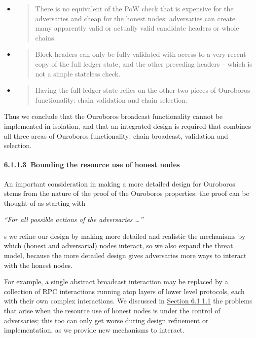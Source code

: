 \documentclass[]{article}
\let\oldparagraph\paragraph
\renewcommand{\paragraph}[1]{\oldparagraph{#1}\mbox{}}
\begin{document}
\begin{itemize}
\item
  \begin{quote}
  There is no equivalent of the PoW check that is expensive for the
  adversaries and cheap for the honest nodes: adversaries can create
  many apparently valid or actually valid candidate headers or whole
  chains.
  \end{quote}
\item
  \begin{quote}
  Block headers can only be fully validated with access to a very recent
  copy of the full ledger state, and the other preceding headers --
  which is not a simple stateless check.
  \end{quote}
\item
  \begin{quote}
  Having the full ledger state relies on the other two pieces of
  Ouroboros functionality: chain validation and chain selection.
  \end{quote}
\end{itemize}

Thus we conclude that the Ouroboros broadcast functionality cannot be
implemented in isolation, and that an integrated design is required that
combines all three areas of Ouroboros functionality: chain broadcast,
validation and selection.

\hypertarget{bounding-the-resource-use-of-honest-nodes}{%
\paragraph{​6.1.1.3​~Bounding the resource use of honest
nodes}\label{bounding-the-resource-use-of-honest-nodes}}

An important consideration in making a more detailed design for
Ouroboros stems from the nature of the proof of the Ouroboros
properties: the proof can be thought of as starting with

\emph{``For all possible actions of the adversaries \ldots{}'' }

s we refine our design by making more detailed and realistic the
mechanisms by which (honest and adversarial) nodes interact, so we also
expand the threat model, because the more detailed design gives
adversaries more ways to interact with the honest nodes.

For example, a single abstract broadcast interaction may be replaced by
a collection of RPC interactions running atop layers of lower level
protocols, each with their own complex interactions. We discussed in
\protect\hyperlink{the-ouroboros-specification}{{Section 6.1.1.1}} the
problems that arise when the resource use of honest nodes is under the
control of adversaries; this too can only get worse during design
refinement or implementation, as we provide new mechanisms to interact.
\end{document}

